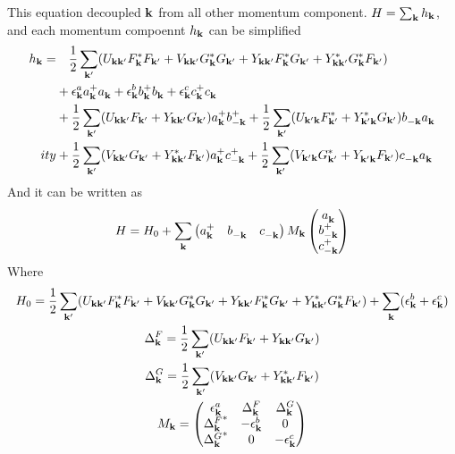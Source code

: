 This equation decoupled $\vk$ from all other momentum component.  $H=\sum_{\vk}h_{\vk}$, and each momentum compoennt $h_{\vk}$ can be simplified 
\begin{equation*}
\begin{split}
 h_{\vk}=&\quad\nth{2}\sum_{\vk'}(U_{\vk\vk'}F_{\vk}^{*}F_{\vk'}+V_{\vk\vk'}G_{\vk}^{*}G_{\vk'}
 +Y_{\vk\vk'}F_{\vk}^{*}G_{\vk'}+Y^*_{\vk\vk'}G_{\vk}^{*}F_{\vk'})\\
 &+\epsilon^a_\vk{}a^+_\vk{}a^{}_\vk+\epsilon^b_\vk{}b^+_\vk{}b^{}_\vk+\epsilon^c_\vk{}c^+_\vk{}c^{}_\vk\\
  &+\nth{2}\sum_{\vk'}(U_{\vk\vk'}F_{\vk'}+Y_{\vk\vk'}G_{\vk'})a^+_\vk{}b^+_{-\vk}{}+\nth{2}\sum_{\vk'}(U_{\vk'\vk}F^{*}_{\vk'}+Y^{*}_{\vk'\vk}G_{\vk'})b^{}_{-\vk}a^{}_{\vk}\\
ity  &+\nth{2}\sum_{\vk'}(V_{\vk\vk'}G_{\vk'}+Y^{*}_{\vk\vk'}F_{\vk'})a^+_\vk{}c^+_{-\vk}{}+\nth{2}\sum_{\vk'}(V_{\vk'\vk}G^{*}_{\vk'}+Y^{}_{\vk'\vk}F_{\vk'})c^{}_{-\vk}a^{}_{\vk}
    \end{split} 
\end{equation*}
And it can be written as 
\begin{equation}\label{eq:threeLinearized}
H=H_{0}+\sum_{\vk}\begin{pmatrix}a^{+}_{\vk}&b^{}_{-\vk}&c^{}_{-\vk}\end{pmatrix}
M_{\vk}
  \begin{pmatrix}a^{}_{\vk}\\b^{+}_{-\vk}\\c^{+}_{-\vk}\end{pmatrix}
\end{equation}
Where 
\begin{gather}
H_{0}=\nth{2}\sum_{\vk'}(U_{\vk\vk'}F_{\vk}^{*}F_{\vk'}+V_{\vk\vk'}G_{\vk}^{*}G_{\vk'}
 +Y_{\vk\vk'}F_{\vk}^{*}G_{\vk'}+Y^*_{\vk\vk'}G_{\vk}^{*}F_{\vk'})+\sum_{\vk}(\epsilon^{b}_{\vk}+\epsilon^{c}_{\vk})\\
 \Delta^{F}_{\vk}=\nth{2}\sum_{\vk'}(U_{\vk\vk'}F_{\vk'}+Y_{\vk\vk'}G_{\vk'})\\
  \Delta^{G}_{\vk}=\nth{2}\sum_{\vk'}(V_{\vk\vk'}G_{\vk'}+Y^{*}_{\vk\vk'}F_{\vk'})\\
  M_{\vk}=\begin{pmatrix}
  \epsilon^{a}_{\vk}&\Delta^{F}_{\vk}&\Delta^{G}_{\vk}\\
  {\Delta^{F}_{\vk}}^{*}&-\epsilon^{b}_{\vk}&0\\
   {\Delta^{G}_{\vk}}^{*}&0&-\epsilon^{c}_{\vk}\label{eq:canonical:M}\\
  \end{pmatrix}
\end{gather}
